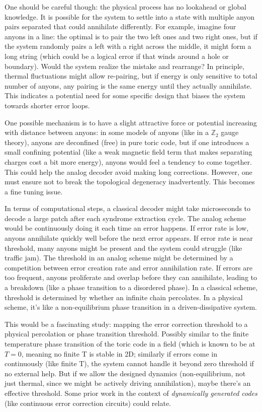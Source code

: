\documentclass[11pt]{article}
\begin{document}
One should be careful though: the physical process has no lookahead or global knowledge. It is possible for the system to settle into a state with multiple anyon pairs separated that could annihilate differently. For example, imagine four anyons in a line: the optimal is to pair the two left ones and two right ones, but if the system randomly pairs a left with a right across the middle, it might form a long string (which could be a logical error if that winds around a hole or boundary). Would the system realize the mistake and rearrange? In principle, thermal fluctuations might allow re-pairing, but if energy is only sensitive to total number of anyons, any pairing is the same energy until they actually annihilate. This indicates a potential need for some specific design that biases the system towards shorter error loops.

One possible mechanism is to have a slight attractive force or potential increasing with distance between anyons: in some models of anyons (like in a $\mathbb{Z}_2$ gauge theory), anyons are deconfined (free) in pure toric code, but if one introduces a small confining potential (like a weak magnetic field term that makes separating charges cost a bit more energy), anyons would feel a tendency to come together. This could help the analog decoder avoid making long corrections. However, one must ensure not to break the topological degeneracy inadvertently. This becomes a fine tuning issue.

In terms of computational steps, a classical decoder might take microseconds to decode a large patch after each syndrome extraction cycle. The analog scheme would be continuously doing it each time an error happens. If error rate is low, anyons annihilate quickly well before the next error appears. If error rate is near threshold, many anyons might be present and the system could struggle (like traffic jam). The threshold in an analog scheme might be determined by a competition between error creation rate and error annihilation rate. If errors are too frequent, anyons proliferate and overlap before they can annihilate, leading to a breakdown (like a phase transition to a disordered phase). In a classical scheme, threshold is determined by whether an infinite chain percolates. In a physical scheme, it's like a non-equilibrium phase transition in a driven-dissipative system.

This would be a fascinating study: mapping the error correction threshold to a physical percolation or phase transition threshold. Possibly similar to the finite temperature phase transition of the toric code in a field (which is known to be at $T=0$, meaning no finite T is stable in 2D; similarly if errors come in continuously (like finite T), the system cannot handle it beyond zero threshold if no external help. But if we allow the designed dynamics (non-equilibrium, not just thermal, since we might be actively driving annihilation), maybe there's an effective threshold. Some prior work in the context of \textit{dynamically generated codes} (like continuous error correction circuits) could relate.
\end{document}
